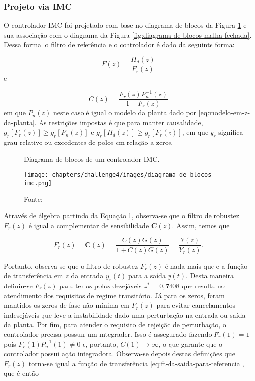 \subsubsection{Projeto via IMC}
\label{subsub:projeto-via-imc}

O controlador IMC foi projetado com base no diagrama de blocos da Figura
\ref{fig:diagrama-de-blocos-imc} e sua associação com o diagrama da Figura
\ref{fig:diagrama-de-blocos-malha-fechada}. Dessa forma, o filtro de referência
e o controlador é dado da seguinte forma:

\begin{equation}
    \label{eq:filtro-de-referencia-imc}
    F(z) = \frac{H_d(z)}{F_r(z)}
\end{equation} e

\begin{equation}
    \label{eq:controlador-imc}
    C(z) = \frac{F_r(z)P_{n}^{-1}(z)}{1-F_r(z)}
\end{equation} em que $P_n(z)$ neste caso é igual o modelo da planta dado por
\ref{eq:modelo-em-z-da-planta}. As restrições impostas é que para manter
causalidade, $g_r\left [ F_r(z) \right ] \geq g_r\left [ P_n(z) \right ]$ e
$g_r\left [ H_d(z) \right ] \geq g_r\left [ F_r(z) \right ]$, em que $g_r$
significa grau relativo ou excedentes de polos em relação a zeros.

\begin{figure}[ht!]
	\centering
	\caption{Diagrama de blocos de um controlador IMC.}
	\label{fig:diagrama-de-blocos-imc}
	\texttt{[image: chapters/challenge4/images/diagrama-de-blocos-imc.png]}
    \caption*{Fonte: }
\end{figure}

Através de álgebra partindo da Equação \ref{fig:diagrama-de-blocos-imc},
observa-se que o filtro de robustez $F_r(z)$ é igual a complementar de
sensibilidade $\boldsymbol{C}(z)$. Assim, temos que

\begin{equation}
    \label{eq:associacao-do-filtro-de-robustez}
    F_r(z) = \boldsymbol{C}(z) = \frac{C(z)G(z)}{1+C(z)G(z)} = \frac{Y(z)}{Y_{r}(z)}.
\end{equation}

Portanto, observa-se que o filtro de robustez $F_r(z)$ é nada mais que e a
função de transferência em $z$ da entrada $y_r(t)$ para a saída $y(t)$. Desta
maneira definiu-se $F_r(z)$ para ter os polos desejáveis $z^* = 0,7408$ que
resulta no atendimento dos requisitos de regime transitório. Já para os zeros,
foram mantidos os zeros de fase não mínima em $F_r(z)$ para evitar cancelamentos
indesejáveis que leve a instabilidade dado uma perturbação na entrada ou saída
da planta. Por fim, para atender o requisito de rejeição de perturbação, o
controlador precisa possuir um integrador. Isso é assegurado fazendo $F_r(1) =
1$ pois $F_r(1)P_{n}^{-1}(1) \neq 0$ e, portanto, $C(1) \rightarrow \infty$, o
que garante que o controlador possui ação integradora. Observa-se depois destas
definições que $F_r(z)$ torna-se igual a função de transferência
\ref{eq:ft-da-saida-para-referencia}, que é então

